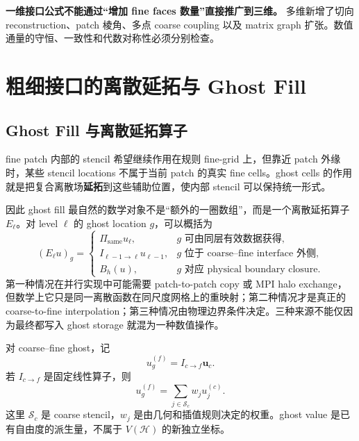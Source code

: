 \begin{warningbox}
\textbf{一维接口公式不能通过“增加 fine faces 数量”直接推广到三维。}
多维新增了切向 reconstruction、patch 棱角、多点 coarse coupling 以及 matrix graph 扩张。数值通量的守恒、一致性和代数对称性必须分别检查。
\end{warningbox}

\section{粗细接口的离散延拓与 Ghost Fill}
\label{sec:amr-ghost-extension}

\subsection{Ghost Fill 与离散延拓算子}

fine patch 内部的 stencil 希望继续作用在规则 fine-grid 上，但靠近 patch 外缘时，某些 stencil locations 不属于当前 patch 的真实 fine cells。ghost cells 的作用就是把复合离散场\textbf{延拓}到这些辅助位置，使内部 stencil 可以保持统一形式。

因此 ghost fill 最自然的数学对象不是“额外的一圈数组”，而是一个离散延拓算子 $E_\ell$。对 level $\ell$ 的 ghost location $g$，可以概括为
\begin{equation}
(E_\ell u)_g
=
\begin{cases}
\Pi_{\mathrm{same}}u_\ell,
& g\text{ 可由同层有效数据获得},\\[1mm]
I_{\ell-1\rightarrow\ell}u_{\ell-1},
& g\text{ 位于 coarse--fine interface 外侧},\\[1mm]
B_h(u),
& g\text{ 对应 physical boundary closure}.
\end{cases}
\label{eq:amr-ghost-extension-operator}
\end{equation}
第一种情况在并行实现中可能需要 patch-to-patch copy 或 MPI halo exchange，但数学上它只是同一离散函数在同尺度网格上的重映射；第二种情况才是真正的 coarse-to-fine interpolation；第三种情况由物理边界条件决定。三种来源不能仅因为最终都写入 ghost storage 就混为一种数值操作。

对 coarse--fine ghost，记
\begin{equation}
u_g^{(f)}
=I_{c\rightarrow f}\bm u_c.
\label{eq:amr_cf_interp_operator}
\end{equation}
若 $I_{c\rightarrow f}$ 是固定线性算子，则
\begin{equation}
\boxed{
u_g^{(f)}
=\sum_{j\in\mathcal S_c}w_j u_j^{(c)}.
}
\label{eq:amr_interp_weights}
\end{equation}
这里 $\mathcal S_c$ 是 coarse stencil，$w_j$ 是由几何和插值规则决定的权重。ghost value 是已有自由度的派生量，不属于 $V(\mathcal H)$ 的新独立坐标。


